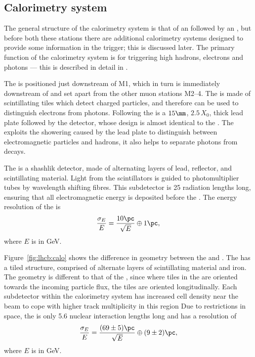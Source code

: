 \subsection{Calorimetry system}

The general structure of the calorimetry system is that of an \ecal followed by an \hcal, but
before both these stations there are additional calorimetry systems designed to provide some \pid
information in the trigger; this is discussed later.
The primary function of the calorimetry system is for triggering high \pt hadrons, electrons and
photons --- this is described in detail in .

The \spd is positioned just downstream of M1, which in turn is immediately downstream of \richtwo
and set apart from the other muon stations M2--4.
The \spd is made of scintillating tiles which detect charged particles, and therefore can be used
to distinguish electrons from photons.
Following the \spd is a $15\mm$, $2.5\,X_0$, thick lead plate followed by the \presh detector,
whose design is almost identical to the \spd.
The \presh exploits the showering caused by the lead plate to distinguish between electromagnetic
particles and hadrons, it also helps to separate photons from \piz decays.

The \ecal is a shashlik detector, made of alternating layers of lead, reflector, and scintillating
material.
Light from the scintillators is guided to photomultiplier tubes by wavelength shifting fibres.
This \ecal subdetector is 25 radiation lengths long,  ensuring that all electromagnetic energy is
deposited before the \hcal.
The energy resolution of the \ecal is
\begin{equation}
  \frac{\sigma_E}{E} = \frac{10\pc}{\sqrt{E}} \oplus 1\pc,
\end{equation}
where $E$ is in GeV.

Figure~\ref{fig:lhcb:calo} shows the difference in geometry between the \ecal and \hcal.
The \hcal has a tiled structure, comprised of alternate layers of scintillating material and iron.
The geometry is different to that of the \ecal, since where tiles in the \ecal are oriented
towards the incoming particle flux, the \hcal tiles are oriented longitudinally.
Each subdetector within the calorimetry system has increased cell density near the beam to cope
with higher track multiplicity in this region
Due to restrictions in space, the \hcal is only 5.6 nuclear interaction lengths long and has a
resolution of
\begin{equation}
  \frac{\sigma_E}{E} = \frac{(69\pm5)\pc}{\sqrt{E}} \oplus (9\pm2)\pc,
\end{equation}
where $E$ is in GeV.


